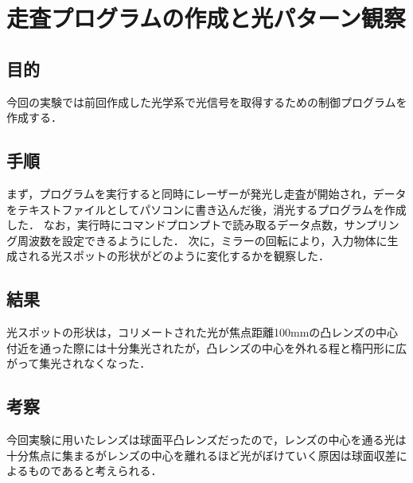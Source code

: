 \documentclass[11pt, a4paper,twocolumn]{jarticle}
\begin{document}
\section{走査プログラムの作成と光パターン観察}
\subsection{目的}
今回の実験では前回作成した光学系で光信号を取得するための制御プログラムを作成する．
\subsection{手順}
まず，プログラムを実行すると同時にレーザーが発光し走査が開始され，データをテキストファイルとしてパソコンに書き込んだ後，消光するプログラムを作成した．
なお，実行時にコマンドプロンプトで読み取るデータ点数，サンプリング周波数を設定できるようにした．
次に，ミラーの回転により，入力物体に生成される光スポットの形状がどのように変化するかを観察した．
\subsection{結果}
光スポットの形状は，コリメートされた光が焦点距離100mmの凸レンズの中心付近を通った際には十分集光されたが，凸レンズの中心を外れる程と楕円形に広がって集光されなくなった．

\subsection{考察}
今回実験に用いたレンズは球面平凸レンズだったので，レンズの中心を通る光は十分焦点に集まるがレンズの中心を離れるほど光がぼけていく原因は球面収差によるものであると考えられる．
\newpage
\end{document}
